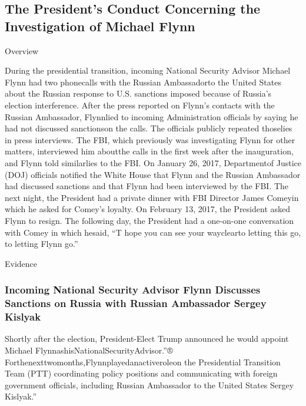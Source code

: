 \subsection{The President's Conduct Concerning the Investigation of Michael Flynn}

Overview

During the presidential transition, incoming National Security Advisor Michael Flynn had two phonecalls with the Russian Ambassadorto the United States about the Russian response to U.S. sanctions imposed because of Russia’s election interference.
After the press reported on Flynn’s contacts with the Russian Ambassador, Flynnlied to incoming Administration officials by saying he had not discussed sanctionson the calls.
The officials publicly repeated thoselies in press interviews.
The FBI, which previously was investigating Flynn for other matters, interviewed him aboutthe calls in the first week after the inauguration, and Flynn told similarlies to the FBI.
On January 26, 2017, Departmentof Justice (DOJ) officials notified the White House that Flynn and the Russian Ambassador had discussed sanctions and that Flynn had been interviewed by the FBI.
The next night, the President had a private dinner with FBI Director James Comeyin which he asked for Comey’s loyalty.
On February 13, 2017, the President asked Flynn to resign.
The following day, the President had a one-on-one conversation with Comey in which hesaid, “T hope you can see your wayclearto letting this go, to letting Flynn go.”

Evidence

\subsubsection{Incoming National Security Advisor Flynn Discusses Sanctions on Russia with Russian Ambassador Sergey Kislyak}

Shortly after the election, President-Elect Trump announced he would appoint Michael FlynnashisNationalSecurityAdvisor.”®
Forthenexttwomonths,Flynnplayedanactiveroleon the Presidential Transition Team (PTT) coordinating policy positions and communicating with foreign government officials, including Russian Ambassador to the United States Sergey Kislyak.”

